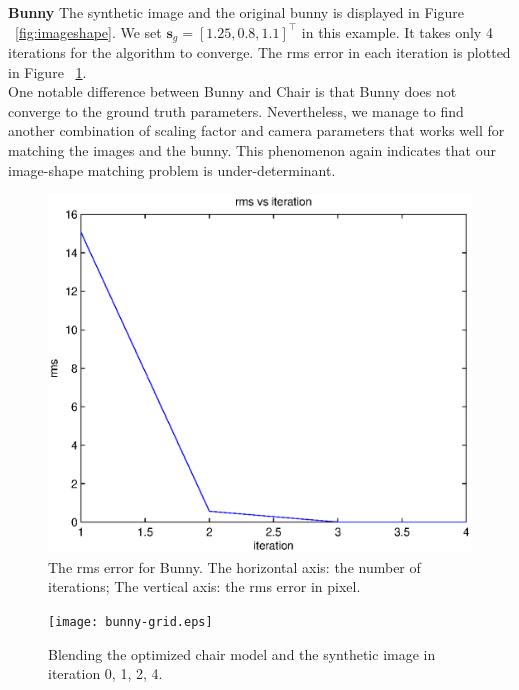 \documentclass[10pt,twocolumn,letterpaper]{article}
\begin{document}
\noindent
\textbf{Bunny} The synthetic image and the original bunny is displayed in Figure ~\ref{fig:imageshape}. We set $\mathbf{s}_g=[1.25, 0.8, 1.1]^\top$ in this example. It takes only 4 iterations for the algorithm to converge. The rms error in each iteration is plotted in Figure ~\ref{fig:bunnyplot}.\\

\noindent
One notable difference between Bunny and Chair is that Bunny does not converge to the ground truth parameters. Nevertheless, we manage to find another combination of scaling factor and camera parameters that works well for matching the images and the bunny. This phenomenon again indicates that our image-shape matching problem is under-determinant.

\begin{figure}[t]
\begin{center}
	\includegraphics[scale=0.55]{bunny-figure.eps}
\end{center}
	\caption{The rms error for Bunny. The horizontal axis: the number of iterations; The vertical axis: the rms error in pixel.}
\label{fig:bunnyplot}
\end{figure}

\begin{figure}
\begin{center}
	\texttt{[image: bunny-grid.eps]}
\end{center}
   \caption{Blending the optimized chair model and the synthetic image in iteration 0, 1, 2, 4.}
\label{fig:bunnygrid}
\end{figure}
\end{document}
